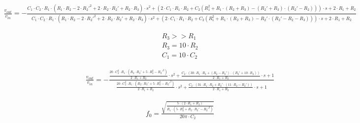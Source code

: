 \begin{ssmall}
\begin{adjustwidth*}{-1.3cm}{}
    \begin{align}
        &\frac{v_{out}}{v_{in}} = - \frac{C_1 \cdot C_2 \cdot R_1 \cdot \left(R_1 \cdot R_2 - 2 \cdot R_2'^2 + 2 \cdot R_2 \cdot R_2' + R_2 \cdot R_3\right) \cdot s^2 +
                                        \left(2 \cdot C_1 \cdot R_1 \cdot R_2 + C_2 \left(R_1^2 + R_1 \cdot \left(R_2 + R_3\right) - \left(R_2' + R_3\right) \cdot \left(R_2' - R_2\right)\right)\right) \cdot s +
                                        2 \cdot R_1 + R_2}
                                        {C_1 \cdot C_2 \cdot R_1 \cdot \left(R_1 \cdot R_2 - 2 \cdot R_2'^2 + 2 \cdot R_2 \cdot R_2' + R_2 \cdot R_3\right) \cdot s^2 +
                                        \left(2 \cdot C_1 \cdot R_1 \cdot R_2 + C_2 \left(R_1^2 + R_1 \cdot \left(R_2 + R_3\right) - R_2' \cdot \left(R_2' - R_2 - R_3\right)\right)\right) \cdot s +
                                        2 \cdot R_1 + R_2} \label{eq:ej5_complete_transference}
    \end{align}
\end{adjustwidth*}
\end{ssmall}

\begin{align}
    &R_3 >> R_1 \\
    &R_3 = 10 \cdot R_2 \\
    &C_1 = 10 \cdot C_2
\end{align}

\begin{align}
    &\frac{v_{out}}{v_{in}} = - \frac{\frac{20 \cdot C_2^2 \cdot R_1 \cdot \left(R_2 \cdot R_2' + 5 \cdot R_2^2 - R_2'^2\right)}{2 \cdot R_1 + R_2} \cdot s^2 +
                                        \frac{C_2 \cdot \left(30 \cdot R_1 \cdot R_2 + \left(R_2 - R_2'\right) \cdot \left(R_2' + 10 \cdot R_2\right)\right)}{2 \cdot R_1 + R_2} \cdot s +
                                        1}
                                        {\frac{20 \cdot C_2^2 \cdot R_1 \cdot \left(R_2 \cdot R_2' + 5 \cdot R_2^2 - R_2'^2\right)}{2 \cdot R_1 + R_2} \cdot s^2 +
                                        \frac{C_2 \cdot \left(31 \cdot R_1 \cdot R_2 + R_2' \cdot \left(11 \cdot R_2 - R_2'\right)\right)}{2 \cdot R_1 + R_2} \cdot s +
                                        1} \label{eq:ej5_complete_transference}
\end{align}

\begin{align}
    &f_0 = \frac{\sqrt{\frac{5 \cdot \left(2 \cdot R_1 + R_2\right)}{R_1 \cdot \left(5 \cdot R_2^2 + R_2 \cdot R_2' - R_2'^2\right)}}}{20 \pi \cdot C_2}
\end{align}

